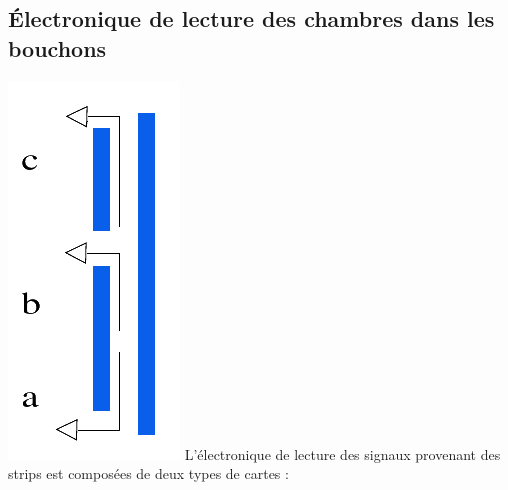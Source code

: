 \subsection{Électronique de lecture des chambres dans les bouchons}
\vspace{-0.2cm}
\marginpar
{
	\centering
	\includegraphics[width=\marginparwidth]{RPC/signalextraction.png}
	\label{extraction}
}
L'électronique de lecture des signaux provenant des strips est composées de deux types de cartes :
